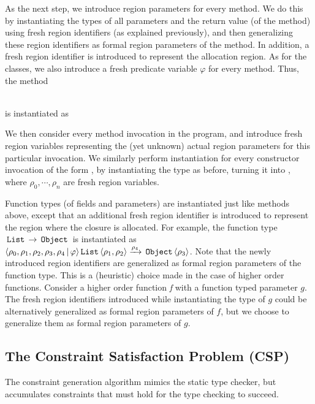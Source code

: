 As the next step, we introduce region parameters for every method.
We do this by instantiating the types of all parameters and the
return value (of the method) using fresh region identifiers (as explained previously),
and then generalizing these region identifiers as formal region parameters
of the method. In addition, a fresh region identifier is introduced to represent the
allocation region.
As for the classes, we also introduce a fresh predicate variable $\varphi$ for every method.
Thus, the method

 \\
is instantiated as


We then consider every method invocation in the program, and introduce
fresh region variables representing the (yet unknown) actual region
parameters for this particular invocation.
%
We similarly perform instantiation for every constructor invocation
of the form , by instantiating the type  as
before, turning it into ,
where $\rho_0, \cdots, \rho_n$ are fresh region variables.

Function types (of fields and parameters) are instantiated just like methods above, except that
an additional fresh region identifier is introduced to represent the region where the closure is
allocated.
For example, the function type $\,{\tt List}\, \rightarrow \,{\tt Object}\,$ is instantiated as
$\langle \rho_0, \rho_1, \rho_2, \rho_3, \rho_4 \,|\, \varphi  \rangle \,{\tt List}\, \langle \rho_1,\rho_2 \rangle \xrightarrow{\rho_4} \,{\tt Object}\,\langle \rho_3 \rangle$.
Note that the newly introduced region identifiers are generalized as formal region parameters of the function type.
This is a (heuristic) choice made in the case of higher order functions.
Consider a higher order function \emph{f} with a function typed parameter $g$.
The fresh region identifiers introduced while instantiating the type of $g$ could be
alternatively generalized as formal region parameters of $f$, but we choose to
generalize them as formal region parameters of $g$.

\subsection{The Constraint Satisfaction Problem (CSP)}
\label{sec:fb-constraintsem}

The constraint generation algorithm mimics the static type checker, but accumulates
constraints that must hold for the type checking to succeed.

